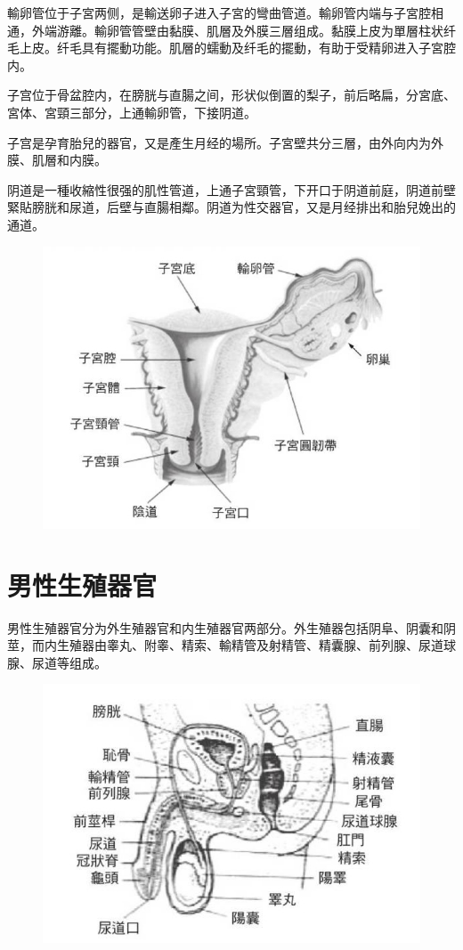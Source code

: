 \documentclass[12pt,UTF8]{ctexbook}
\begin{document}
輸卵管位于子宮两侧，是輸送卵子进入子宮的彎曲管道。輸卵管内端与子宮腔相通，外端游離。輸卵管管壁由黏膜、肌層及外膜三層组成。黏膜上皮为單層柱状纤毛上皮。纤毛具有擺動功能。肌層的蠕動及纤毛的擺動，有助于受精卵进入子宮腔内。

子宫位于骨盆腔内，在膀胱与直腸之间，形状似倒置的梨子，前后略扁，分宮底、宮体、宮頸三部分，上通輸卵管，下接阴道。

子宫是孕育胎兒的器官，又是產生月经的場所。子宮壁共分三層，由外向内为外膜、肌層和内膜。

阴道是一種收縮性很强的肌性管道，上通子宮頸管，下开口于阴道前庭，阴道前壁緊貼膀胱和尿道，后壁与直腸相鄰。阴道为性交器官，又是月经排出和胎兒娩出的通道。

\begin{figure}[htbp]
	\centering
	\includegraphics[width=0.7\linewidth]{3}
	\caption{}
\end{figure}

\section{男性生殖器官}

男性生殖器官分为外生殖器官和内生殖器官两部分。外生殖器包括阴阜、阴囊和阴莖，而内生殖器由睾丸、附睾、精索、輸精管及射精管、精囊腺、前列腺、尿道球腺、尿道等组成。

\begin{figure}[htbp]
	\centering
	\includegraphics[width=0.7\linewidth]{4}
	\caption{}
\end{figure}
\end{document}
